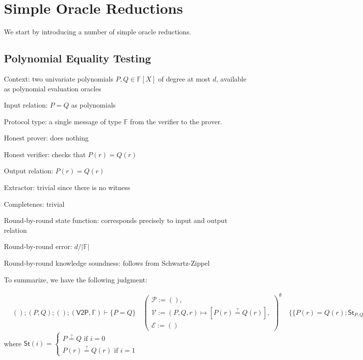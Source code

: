 \section{Simple Oracle Reductions}

We start by introducing a number of simple oracle reductions.

\subsection{Polynomial Equality Testing}

Context: two univariate polynomials $P, Q \in \mathbb{F}[X]$ of degree at most $d$, available as polynomial evaluation oracles

Input relation: $P = Q$ as polynomials

Protocol type: a single message of type $\mathbb{F}$ from the verifier to the prover.

Honest prover: does nothing

Honest verifier: checks that $P(r) = Q(r)$

Output relation: $P(r) = Q(r)$

Extractor: trivial since there is no witness

Completenes: trivial

Round-by-round state function: corresponds precisely to input and output relation

\newcommand{\abs}[1]{\lvert #1 \rvert}

Round-by-round error: $d / \abs{\mathbb{F}}$

Round-by-round knowledge soundness: follows from Schwartz-Zippel

To summarize, we have the following judgment:

\begin{align}
    & (); (P, Q); (); (\mathsf{V2P}, \mathbb{F}) \vdash \{P = Q\} \quad \left(
    \begin{array}{l}
        \mathcal{P} := (), \\
        \mathcal{V} := (P,Q,r) \mapsto [P(r) \stackrel{?}{=} Q(r)], \\
        \mathcal{E} := ()
    \end{array}
    \right)^{\emptyset} \quad \{\!\{P(r) = Q(r); \mathsf{St}_{P,Q}; \frac{d}{\abs{\mathbb{F}}}\}\!\}
\end{align}
where $\mathsf{St}(i) = \begin{cases} P \stackrel{?}{=} Q \text{ if } i = 0 \\ P(r) \stackrel{?}{=} Q(r) \text{ if } i = 1 \end{cases}$

